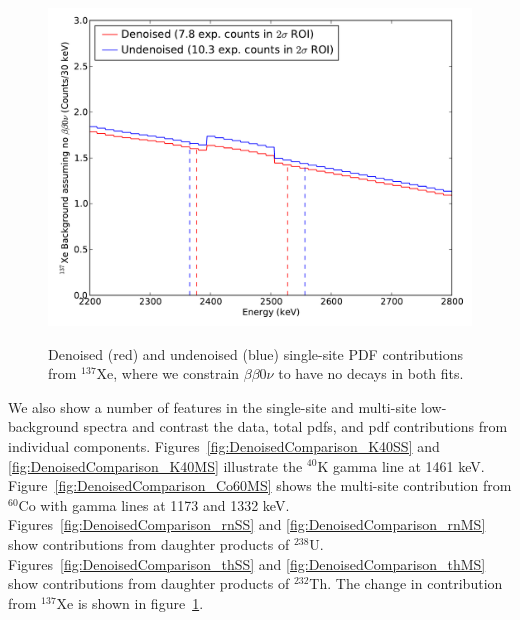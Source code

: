 \begin{figure}
\begin{center}
\includegraphics[keepaspectratio=true,width=\textwidth]{DenoisedVsUndenoised_SSPdf_Xe137Only.pdf}
\end{center}
\renewcommand{\baselinestretch}{1}
\small\normalsize
\begin{quote}
\caption{Denoised (red) and undenoised (blue) single-site PDF contributions from $^{137}$Xe, where we constrain $\beta\beta 0\nu$ to have no decays in both fits.}
\label{fig:DenoisedComparison_PdfComponentsXe137}
\end{quote}
\end{figure}
\renewcommand{\baselinestretch}{2}
\small\normalsize

We also show a number of features in the single-site and multi-site low-background spectra and contrast the data, total pdfs, and pdf contributions from individual components.  Figures~\ref{fig:DenoisedComparison_K40SS} and \ref{fig:DenoisedComparison_K40MS} illustrate the $^{40}$K gamma line at 1461 keV.  Figure~\ref{fig:DenoisedComparison_Co60MS} shows the multi-site contribution from $^{60}$Co with gamma lines at 1173 and 1332 keV.  Figures~\ref{fig:DenoisedComparison_rnSS} and \ref{fig:DenoisedComparison_rnMS} show contributions from daughter products of $^{238}$U.  Figures~\ref{fig:DenoisedComparison_thSS} and \ref{fig:DenoisedComparison_thMS} show contributions from daughter products of $^{232}$Th.  The change in contribution from $^{137}$Xe is shown in figure~\ref{fig:DenoisedComparison_PdfComponentsXe137}.

